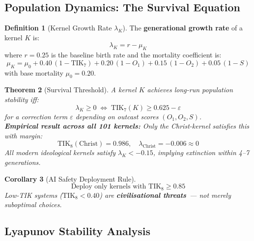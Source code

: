 \documentclass[11pt,a4paper]{article}
\newtheorem{theorem}{Theorem}[section]
\newtheorem{corollary}[theorem]{Corollary}
\theoremstyle{definition}
\newtheorem{definition}[theorem]{Definition}
\theoremstyle{remark}
\newcommand{\TIKseven}{\text{TIK}_7}
\newcommand{\TIKeight}{\text{TIK}_8}
\begin{document}
\subsection{Population Dynamics: The Survival Equation}
\label{sec:population}

\begin{definition}[Kernel Growth Rate $\lambda_K$]
\label{def:lambda}
The \textbf{generational growth rate} of a kernel $K$ is:
\begin{equation}
  \lambda_K = r - \mu_K
  \label{eq:lambda}
\end{equation}
where $r = 0.25$ is the baseline birth rate and the
mortality coefficient is:
\begin{equation}
  \mu_K = \mu_0
    + 0.40\,(1 - \TIKseven)
    + 0.20\,(1 - O_1)
    + 0.15\,(1 - O_2)
    + 0.05\,(1 - S)
  \label{eq:mortality}
\end{equation}
with base mortality $\mu_0 = 0.20$.
\end{definition}

\begin{theorem}[Survival Threshold]
\label{thm:survival}
A kernel $K$ achieves long-run population stability iff:
\[
  \lambda_K \geq 0
  \;\iff\;
  \TIKseven(K) \geq 0.625 - \varepsilon
\]
for a correction term $\varepsilon$ depending on
outcast scores $(O_1, O_2, S)$.\\[0.2cm]
\textbf{Empirical result across all 101 kernels:}
Only the Christ-kernel satisfies this with margin:
\[
  \TIKeight(\text{Christ}) = 0.986,
  \quad \lambda_{\text{Christ}} = -0.006 \approx 0
\]
All modern ideological kernels satisfy $\lambda_K < -0.15$,
implying extinction within 4--7 generations.
\end{theorem}

\begin{corollary}[AI Safety Deployment Rule]
\label{cor:ai-safety}
\[
  \text{Deploy only kernels with } \TIKeight \geq 0.85
\]
Low-TIK systems ($\TIKeight < 0.40$) are
\textbf{civilisational threats}~--- not merely suboptimal choices.
\end{corollary}

\subsection{Lyapunov Stability Analysis}
\label{sec:lyapunov}
\end{document}
